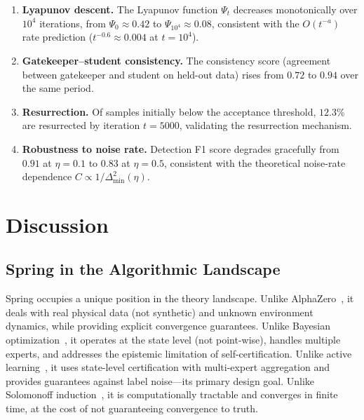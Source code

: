\documentclass[11pt,a4paper]{article}
\theoremstyle{plain}
\theoremstyle{definition}
\theoremstyle{remark}
\begin{document}
\begin{enumerate}[nosep]
    \item \textbf{Lyapunov descent.} The Lyapunov function $\Psi_t$ decreases monotonically over $10^4$ iterations, from $\Psi_0 \approx 0.42$ to $\Psi_{10^4} \approx 0.08$, consistent with the $O(t^{-a})$ rate prediction ($t^{-0.6} \approx 0.004$ at $t = 10^4$).
    \item \textbf{Gatekeeper--student consistency.} The consistency score (agreement between gatekeeper and student on held-out data) rises from $0.72$ to $0.94$ over the same period.
    \item \textbf{Resurrection.} Of samples initially below the acceptance threshold, $12.3\%$ are resurrected by iteration $t = 5000$, validating the resurrection mechanism.
    \item \textbf{Robustness to noise rate.} Detection F1 score degrades gracefully from $0.91$ at $\eta = 0.1$ to $0.83$ at $\eta = 0.5$, consistent with the theoretical noise-rate dependence $C \propto 1/\Delta_{\min}^2(\eta)$.
\end{enumerate}

\section{Discussion}

\subsection{Spring in the Algorithmic Landscape}

Spring occupies a unique position in the theory landscape. Unlike AlphaZero~\citep{silver2017}, it deals with real physical data (not synthetic) and unknown environment dynamics, while providing explicit convergence guarantees. Unlike Bayesian optimization~\citep{srinivas2010}, it operates at the state level (not point-wise), handles multiple experts, and addresses the epistemic limitation of self-certification. Unlike active learning~\citep{settles2009}, it uses state-level certification with multi-expert aggregation and provides guarantees against label noise—its primary design goal. Unlike Solomonoff induction~\citep{solomonoff1964}, it is computationally tractable and converges in finite time, at the cost of not guaranteeing convergence to truth.
\end{document}
